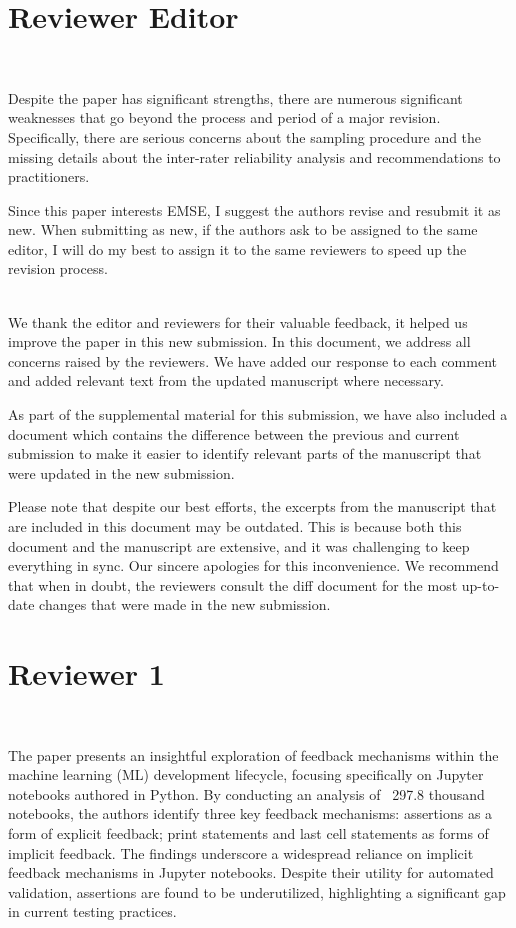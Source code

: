 \documentclass[11pt,fleqn]{article}
\title{\vspace*{-2cm}{\bf Authors' Response to the Review of
 EMSE-D-24-00354:\\
 ``Understanding Feedback Mechanisms in Machine Learning Jupyter Notebooks''}}
\author{Arumoy Shome, Lu\'{i}s Cruz, Diomidis Spinellis, Arie van Deursen}
\date{}
\newcommand{\eline}{\vspace*{.75\baselineskip}}
\newcommand{\Referee}[1]{\eline \noindent {\bf Reviewer comment #1:} \\}
\newcommand{\Us}{\eline \noindent {\bf Response:}\\}
\newcommand{\newreviewer}[1]{\section*{Reviewer #1}\vspace*{-1.05\baselineskip}}
\newenvironment{revcomment}[1][]
{\Referee{#1}\begin{rcomment}}
{\end{rcomment}}
\begin{document}
\maketitle

\newreviewer{Editor}

\begin{revcomment}

  Despite the paper has significant strengths, there are numerous significant weaknesses that go beyond the process and period of a major revision. Specifically, there are serious concerns about the sampling procedure and the missing details about the inter-rater reliability analysis and recommendations to practitioners.

  Since this paper interests EMSE, I suggest the authors revise and resubmit it as new. When submitting as new, if the authors ask to be assigned to the same editor, I will do my best to assign it to the same reviewers to speed up the revision process.

\end{revcomment}

\Us We thank the editor and reviewers for their valuable feedback, it helped us improve the paper in this new submission. In this document, we address all concerns raised by the reviewers. We have added our response to each comment and added relevant text from the updated manuscript where necessary.

As part of the supplemental material for this submission, we have also included a document which contains the difference between the previous and current submission to make it easier to identify relevant parts of the manuscript that were updated in the new submission.

Please note that despite our best efforts, the excerpts from the manuscript that are included in this document may be outdated. This is because both this document and the manuscript are extensive, and it was challenging to keep everything in sync. Our sincere apologies for this inconvenience. We recommend that when in doubt, the reviewers consult the diff document for the most up-to-date changes that were made in the new submission.

\newreviewer{1}

\begin{revcomment}[1.1]
  The paper presents an insightful exploration of feedback mechanisms within the machine learning (ML) development lifecycle, focusing specifically on Jupyter notebooks authored in Python. By conducting an analysis of ~297.8 thousand notebooks, the authors identify three key feedback mechanisms: assertions as a form of explicit feedback; print statements and last cell statements as forms of implicit feedback. The findings underscore a widespread reliance on implicit feedback mechanisms in Jupyter notebooks. Despite their utility for automated validation, assertions are found to be underutilized, highlighting a significant gap in current testing practices.

\end{revcomment}
\end{document}
